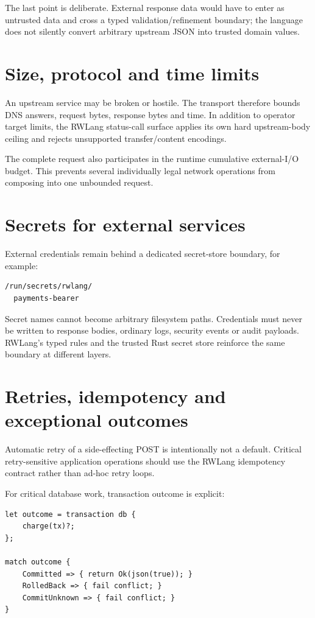 The last point is deliberate. External response data would have to enter as untrusted data and cross a typed validation/refinement boundary; the language does not silently convert arbitrary upstream JSON into trusted domain values.

\section{Size, protocol and time limits}

An upstream service may be broken or hostile. The transport therefore bounds DNS answers, request bytes, response bytes and time. In addition to operator target limits, the RWLang status-call surface applies its own hard upstream-body ceiling and rejects unsupported transfer/content encodings.

The complete request also participates in the runtime cumulative external-I/O budget. This prevents several individually legal network operations from composing into one unbounded request.

\section{Secrets for external services}

External credentials remain behind a dedicated secret-store boundary, for example:

\begin{lstlisting}
/run/secrets/rwlang/
  payments-bearer
\end{lstlisting}

Secret names cannot become arbitrary filesystem paths. Credentials must never be written to response bodies, ordinary logs, security events or audit payloads. RWLang's typed  rules and the trusted Rust secret store reinforce the same boundary at different layers.

\section{Retries, idempotency and exceptional outcomes}

Automatic retry of a side-effecting POST is intentionally not a default. Critical retry-sensitive application operations should use the RWLang idempotency contract rather than ad-hoc retry loops.

For critical database work, transaction outcome is explicit:

\begin{lstlisting}[language=RWLang]
let outcome = transaction db {
    charge(tx)?;
};

match outcome {
    Committed => { return Ok(json(true)); }
    RolledBack => { fail conflict; }
    CommitUnknown => { fail conflict; }
}
\end{lstlisting}

